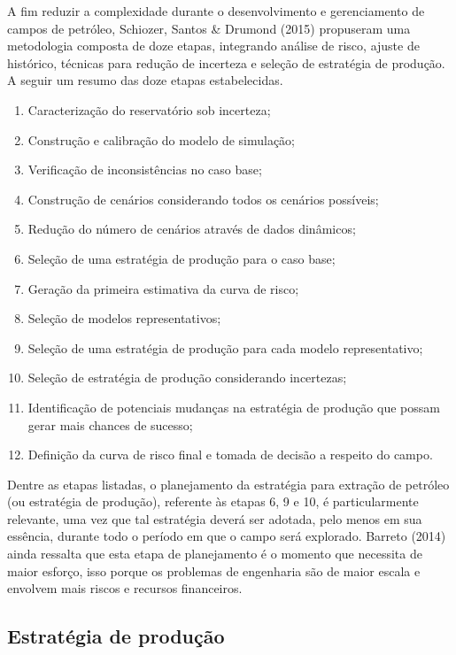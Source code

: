 A fim reduzir a complexidade durante o desenvolvimento e gerenciamento de campos de petróleo, Schiozer, Santos \& Drumond (2015) propuseram uma metodologia composta de doze etapas, integrando análise de risco, ajuste de histórico, técnicas para redução de incerteza e seleção de estratégia de produção. A seguir um resumo das doze etapas estabelecidas.

\begin{enumerate}
\item Caracterização do reservatório sob incerteza;
\item Construção e calibração do modelo de simulação;
\item Verificação de inconsistências no caso base;
\item Construção de cenários considerando todos os cenários possíveis;
\item Redução do número de cenários através de dados dinâmicos;
\item Seleção de uma estratégia de produção para o caso base;
\item Geração da primeira estimativa da curva de risco;
\item Seleção de modelos representativos;
\item Seleção de uma estratégia de produção para cada modelo representativo;
\item Seleção de estratégia de produção considerando incertezas;
\item Identificação de potenciais mudanças na estratégia de produção que possam gerar mais chances de sucesso;
\item Definição da curva de risco final e tomada de decisão a respeito do campo. 

\end{enumerate}

Dentre as etapas listadas, o planejamento da estratégia para extração de petróleo (ou estratégia de produção), referente às etapas 6, 9 e 10, é particularmente relevante, uma vez que tal estratégia deverá ser adotada, pelo menos em sua essência, durante todo o período em que o campo será explorado. Barreto (2014) ainda ressalta que esta etapa de planejamento é o momento que necessita de maior esforço, isso porque os problemas de engenharia são de maior escala e envolvem mais riscos e recursos financeiros.

\subsection{Estratégia de produção }

